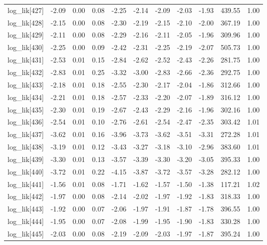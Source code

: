 \begin{table}[ht]
\begin{tabular}{rrrrrrrrrrr}
  log\_lik[427] & -2.09 & 0.00 & 0.08 & -2.25 & -2.14 & -2.09 & -2.03 & -1.93 & 439.55 & 1.00 \\ 
  log\_lik[428] & -2.15 & 0.00 & 0.08 & -2.30 & -2.19 & -2.15 & -2.10 & -2.00 & 367.19 & 1.00 \\ 
  log\_lik[429] & -2.11 & 0.00 & 0.08 & -2.29 & -2.16 & -2.11 & -2.05 & -1.96 & 309.96 & 1.00 \\ 
  log\_lik[430] & -2.25 & 0.00 & 0.09 & -2.42 & -2.31 & -2.25 & -2.19 & -2.07 & 505.73 & 1.00 \\ 
  log\_lik[431] & -2.53 & 0.01 & 0.15 & -2.84 & -2.62 & -2.52 & -2.43 & -2.26 & 281.75 & 1.00 \\ 
  log\_lik[432] & -2.83 & 0.01 & 0.25 & -3.32 & -3.00 & -2.83 & -2.66 & -2.36 & 292.75 & 1.00 \\ 
  log\_lik[433] & -2.18 & 0.01 & 0.18 & -2.55 & -2.30 & -2.17 & -2.04 & -1.86 & 312.66 & 1.00 \\ 
  log\_lik[434] & -2.21 & 0.01 & 0.18 & -2.57 & -2.33 & -2.20 & -2.07 & -1.89 & 316.12 & 1.00 \\ 
  log\_lik[435] & -2.30 & 0.01 & 0.19 & -2.67 & -2.43 & -2.29 & -2.16 & -1.96 & 302.16 & 1.00 \\ 
  log\_lik[436] & -2.54 & 0.01 & 0.10 & -2.76 & -2.61 & -2.54 & -2.47 & -2.35 & 303.42 & 1.01 \\ 
  log\_lik[437] & -3.62 & 0.01 & 0.16 & -3.96 & -3.73 & -3.62 & -3.51 & -3.31 & 272.28 & 1.01 \\ 
  log\_lik[438] & -3.19 & 0.01 & 0.12 & -3.43 & -3.27 & -3.18 & -3.10 & -2.96 & 383.60 & 1.01 \\ 
  log\_lik[439] & -3.30 & 0.01 & 0.13 & -3.57 & -3.39 & -3.30 & -3.20 & -3.05 & 395.33 & 1.00 \\ 
  log\_lik[440] & -3.72 & 0.01 & 0.22 & -4.15 & -3.87 & -3.72 & -3.57 & -3.28 & 282.12 & 1.00 \\ 
  log\_lik[441] & -1.56 & 0.01 & 0.08 & -1.71 & -1.62 & -1.57 & -1.50 & -1.38 & 117.21 & 1.02 \\ 
  log\_lik[442] & -1.97 & 0.00 & 0.08 & -2.14 & -2.02 & -1.97 & -1.92 & -1.83 & 318.33 & 1.00 \\ 
  log\_lik[443] & -1.92 & 0.00 & 0.07 & -2.06 & -1.97 & -1.91 & -1.87 & -1.78 & 396.55 & 1.00 \\ 
  log\_lik[444] & -1.95 & 0.00 & 0.07 & -2.08 & -1.99 & -1.95 & -1.90 & -1.83 & 330.28 & 1.00 \\ 
  log\_lik[445] & -2.03 & 0.00 & 0.08 & -2.19 & -2.09 & -2.03 & -1.97 & -1.87 & 395.24 & 1.00 \\ 

\end{tabular}
\end{table}
